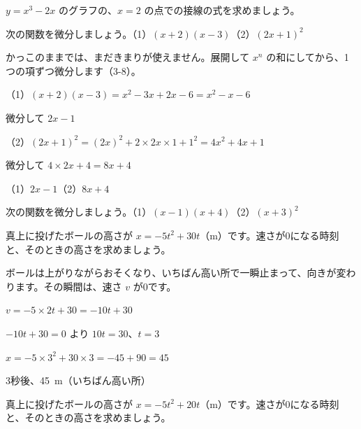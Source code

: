 \begin{jibun}
$y=x^3-2x$ のグラフの、$x=2$ の点での接線の式を求めましょう。
\end{jibun}

\begin{reidai}[展開してから微分する]
次の関数を微分しましょう。\quad（1）$(x+2)(x-3)$\quad（2）$(2x+1)^2$\par
\kangaekata かっこのままでは、まだきまりが使えません。展開して $x^n$ の和にしてから、1つの項ずつ微分します（3-8）。\par
\shiki（1）$(x+2)(x-3)=x^2-3x+2x-6=x^2-x-6$\par
\hspace*{4.3\zw}微分して $2x-1$\par
\hspace*{2.6\zw}（2）$(2x+1)^2=(2x)^2+2\times2x\times1+1^2=4x^2+4x+1$\par
\hspace*{4.3\zw}微分して $4\times2x+4=8x+4$\par
\kotae （1）$2x-1$\quad（2）$8x+4$
\end{reidai}

\begin{jibun}
次の関数を微分しましょう。\quad（1）$(x-1)(x+4)$\quad（2）$(x+3)^2$
\end{jibun}

\begin{reidai}
真上に投げたボールの高さが $x=-5t^2+30t$（m）です。速さが0になる時刻と、そのときの高さを求めましょう。\par
\kangaekata ボールは上がりながらおそくなり、いちばん高い所で一瞬止まって、向きが変わります。その瞬間は、速さ $v$ が0です。\par
\shiki $v=-5\times2t+30=-10t+30$\par
\hspace*{2.6\zw}$-10t+30=0$ より $10t=30$、$t=3$\par
\hspace*{2.6\zw}$x=-5\times3^2+30\times3=-45+90=45$\par
\kotae 3秒後、\qty{45}{m}（いちばん高い所）
\end{reidai}

\begin{jibun}
真上に投げたボールの高さが $x=-5t^2+20t$（m）です。速さが0になる時刻と、そのときの高さを求めましょう。
\end{jibun}

